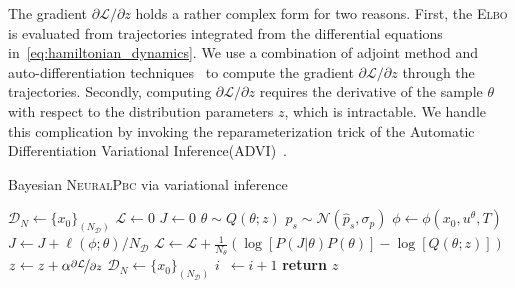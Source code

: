 \begin{enumerate}
    The gradient ${\partial \mathcal{L}}/{\partial z}$ holds a rather complex form for two reasons.
    First, the \textsc{Elbo} is evaluated from trajectories integrated from the differential equations in~\eqref{eq:hamiltonian_dynamics}.
    We use a combination of adjoint method and auto-differentiation techniques~\cite{chen2018neural} to compute the
    gradient ${\partial \mathcal{L}}/{\partial z}$ through the trajectories.
    Secondly, computing ${\partial \mathcal{L}}/{\partial z}$ requires the derivative
    of the sample $\theta$ with respect to the distribution parameters $z$, which is
    intractable. We handle this complication by invoking the reparameterization
    trick of the Automatic Differentiation Variational
    Inference(\textsc{ADVI})~\cite{kucukelbir2015automatic}.

    \begin{algorithm}
        \caption{Bayesian \textsc{NeuralPbc} via variational inference}
        \label{algo:vi}
        \small
        \begin{algorithmic}[1]
            \algrenewcommand\algorithmicindent{0em} %
            \State $\mathcal{D}_N \gets \{x_0\}_{(N_{\mathcal{D}})}$   
            \algrenewcommand\algorithmicindent{1.1em} %
            \State $\mathcal{L} \gets 0$ 
             
            \State $J \gets 0$ 
            \State $\theta \sim Q(\theta; z)$ 
                \State $p_s \sim \mathcal{N}(\hat{p}_s, \sigma_p)$
                \State $\phi \leftarrow \phi(x_0, u^\theta, T) $
                \State $J \gets J + \ell(\phi; \theta)/N_{\mathcal{D}}$ 
                \EndFor
            \State $\mathcal{L} \gets \mathcal{L} + \frac{1}{N_{\theta}} \left(\log[P(J | \theta) P(\theta)] - \log[Q(\theta;z)]\right)$
            \EndFor
            \State $z \gets z + \alpha \nicefrac{\partial \mathcal{L}}{\partial z}$
            \State $\mathcal{D}_N \gets \{x_0\}_{(N_{\mathcal{D}})}$
            \State $i \;\:\gets i + 1$
            \EndWhile
            \State \textbf{return} $z$
        \end{algorithmic}
    \end{algorithm}
  
    \end{enumerate}

